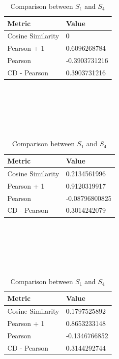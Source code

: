 \begin{table}[!htb]
\begin{subtable}{.5\linewidth}
    \end{subtable}
    \begin{subtable}{.5\linewidth}
      \centering
      
            \begin{tabular}{ll}
            \hline
            Metric            & Value         \\
            \hline
            Cosine Similarity & 0             \\
            Pearson + 1       & 0.6096268784  \\
            Pearson           & -0.3903731216 \\
            CD - Pearson      & 0.3903731216  \\
            \hline
            \end{tabular}\\
            \\
            \caption{Comparison between $S_1$ and $S_3$}\\
            \\
            
            \begin{tabular}{ll}
            \\
            \hline
            Metric            & Value         \\
            \hline
            Cosine Similarity & 0.2134561996  \\
            Pearson + 1       & 0.9120319917  \\
            Pearson           & -0.08796800825 \\
            CD - Pearson      & 0.3014242079   \\
            \hline
            \end{tabular}\\
            \\
            \caption{Comparison between $S_2$ and $S_4$}\\
            \\
            
            \begin{tabular}{ll}
            \\
            \hline
            Metric            & Value         \\
            \hline
            Cosine Similarity & 0.1797525892  \\
            Pearson + 1       & 0.8653233148  \\
            Pearson           & -0.1346766852 \\
            CD - Pearson      & 0.3144292744  \\
            \hline
            \end{tabular}\\
            \\
            \caption{Comparison between $S_1$ and $S_4$}\\
            \\
            

\end{subtable}
\end{table}
